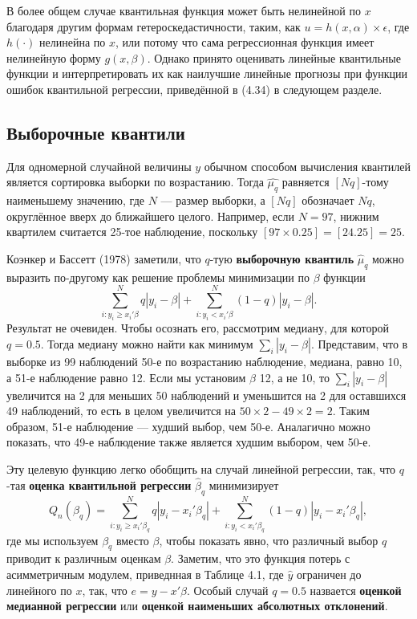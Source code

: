 В более общем случае квантильная функция может быть нелинейной по $x$ благодаря другим формам гетероскедастичности, таким, как $u=h(x,\alpha) \times \epsilon$, где $h(\cdot)$ нелинейна по $x$, или потому что сама регрессионная функция имеет нелинейную форму $g(x, \beta)$. Однако принято оценивать линейные квантильные функции и интерпретировать их как наилучшие линейные прогнозы при функции ошибок квантильной регрессии, приведённой в (4.34) в следующем разделе.  

\subsection{Выборочные квантили }

Для одномерной случайной величины $y$ обычном способом вычисления квантилей является сортировка выборки по возрастанию. Тогда $\hat{\mu_q}$ равняется $[Nq]$-тому наименьшему значению, где $N$ --- размер выборки, а  $[Nq]$ обозначает $Nq$, округлённое вверх до ближайшего целого. Например, если $N=97$, нижним квартилем считается 25-тое наблюдение, поскольку $[97 \times 0.25] =[24.25] = 25$.

Коэнкер и Бассетт (1978) заметили, что $q$-тую \textbf{выборочную квантиль} $\hat{\mu}_q$ можно выразить по-другому как решение проблемы минимизации по $\beta$ функции
$$\sum_{i:y_i \geq x_i'\beta}^{N} q|y_i-\beta| + \sum_{i:y_i < x_i'\beta}^{N} (1-q)|y_i-\beta|. $$
Результат не очевиден. Чтобы осознать его, рассмотрим медиану, для которой $q=0.5$. Тогда медиану можно найти как минимум $\sum_i |y_i -\beta|$. Представим, что в выборке из 99 наблюдений 50-е по возрастанию наблюдение, медиана, равно 10, а 51-е наблюдение равно 12. Если мы установим $\beta$ 12, а не 10, то $\sum_i |y_i -\beta|$ увеличится на 2 для меньших 50 наблюдений и уменьшится на 2 для оставшихся 49 наблюдений, то есть в целом увеличится на $50 \times 2 - 49 \times 2 = 2$. Таким образом, 51-е наблюдение --- худший выбор, чем 50-е. Аналагично можно показать, что 49-е наблюдение также является худшим выбором, чем 50-е.

Эту целевую функцию легко обобщить на случай линейной регрессии, так, что $q$-тая \textbf{оценка квантильной регрессии} $\hat{\beta}_q$ минимизирует
\begin{equation}
Q_n(\beta_q) = \sum_{i:y_i \geq x_i'\beta_q}^{N} q|y_i-x_i'\beta_q| + \sum_{i:y_i < x_i'\beta_q}^{N} (1-q)|y_i-x_i'\beta_q|,
\end{equation}
где мы используем $\beta_q$ вместо $\beta$, чтобы показать явно, что различный выбор $q$ приводит к различным оценкам $\beta$. Заметим, что это функция потерь с асимметричным модулем, приведнная в Таблице 4.1, где $\hat{y}$ ограничен до линейного по $x$, так, что $e = y -x'\beta$.  Особый случай $q=0.5$ назвается \textbf{оценкой медианной регрессии} или \textbf{оценкой наименьших абсолютных отклонений}. 

